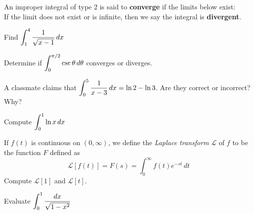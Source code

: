 \documentclass[notes]{subfiles}
\begin{document}
		\begin{defn}
			An improper integral of type 2 is said to \textbf{converge} if the limits below exist:\\[70pt]
			
			If the limit does not exist or is infinite, then we say the integral is \textbf{divergent}.
		\end{defn}
		
		\begin{ex}
			Find $\displaystyle \int_1^4 \dfrac{1}{\sqrt{x-1}}\, dx$
		\end{ex}
			\newpage
			
		\begin{ex}
			Determine if $\displaystyle \int_0^{\pi/2} \csc \theta \, d\theta$ converges or diverges.
		\end{ex}
			
		\begin{ex}
			A classmate claims that $\displaystyle \int_0^5 \dfrac{1}{x-3}\, dx = \ln 2 - \ln 3$.  Are they correct or incorrect?  Why?
		\end{ex}
			
		\begin{ex}
			Compute $\displaystyle \int_0^1 \ln x\, dx$
		\end{ex}
			\newpage
			
		\begin{ex}
			If $f(t)$ is continuous on $(0,\infty)$, we define the \emph{Laplace transform} $\mathcal{L}$ of $f$ to be the function $F$ defined as \[\mathcal{L}[f(t)] = F(s) = \int_0^\infty f(t)e^{-st}\, dt\]
			Compute $\mathcal{L}[1]$ and $\mathcal{L}[t]$.
		\end{ex}
			
		\begin{ex}
			Evaluate $\displaystyle \int_0^1 \dfrac{dx}{\sqrt{1-x^2}}$
		\end{ex}
			\newpage
			
\end{document}

